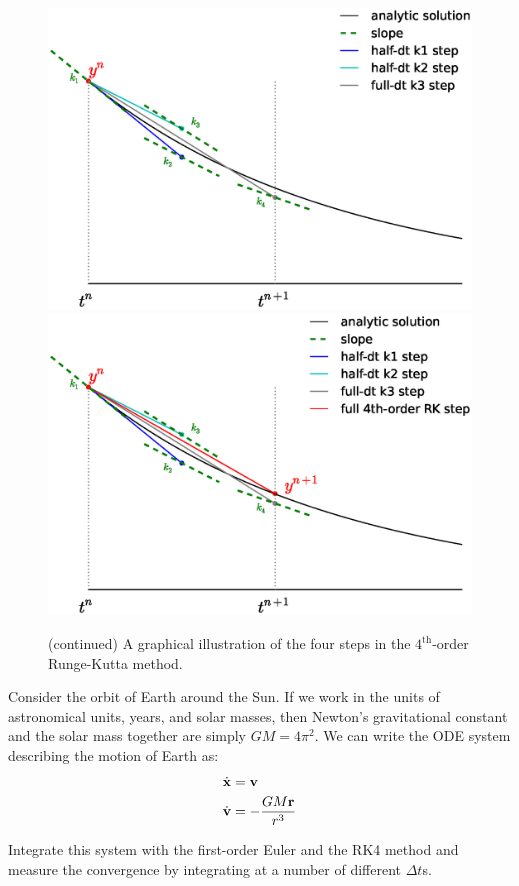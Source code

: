 \begin{figure}[t]
\ContinuedFloat
\centering
\includegraphics[width=0.65\linewidth]{rk4_k4.eps} \\
\includegraphics[width=0.7\linewidth]{rk4_final.eps} \\
%
\caption[$4^\mathrm{th}$-order Runge-Kutta continued] {\label{fig:rk}
  (continued) A graphical illustration of the four steps in the
  $4^\mathrm{th}$-order Runge-Kutta method.}
\end{figure}

\begin{exercise}
Consider the orbit of Earth around the Sun.  If we work in the units
of astronomical units, years, and solar masses, then Newton's gravitational
constant and the solar mass together are simply $G M = 4\pi^2$.  We 
can write the ODE system describing the motion of Earth as:
\begin{align}
\dot{\bf x} &= {\bf v} \\
\dot{\bf v} &= -\frac{G M {\bf r}}{r^3}
\end{align}

Integrate this system with the first-order Euler and the RK4 method
and measure the convergence by integrating at a number of different $\Delta t$s.
\end{exercise}

